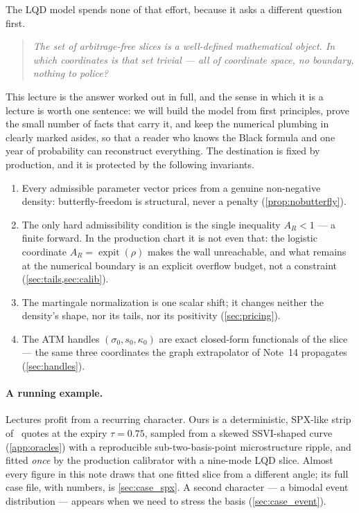 \documentclass[11pt]{article}
\begin{document}
The LQD model spends none of that effort, because it asks a different
question first.

\begin{quote}
\emph{The set of arbitrage-free slices is a well-defined mathematical object.
In which coordinates is that set trivial --- all of coordinate space, no
boundary, nothing to police?}
\end{quote}

This lecture is the answer worked out in full, and the sense in which it is a
lecture is worth one sentence: we will build the model from first principles,
prove the small number of facts that carry it, and keep the numerical
plumbing in clearly marked asides, so that a reader who knows the Black
formula and one year of probability can reconstruct everything.  The
destination is fixed by production, and it is protected by the following
invariants.

\begin{invariant}
\begin{enumerate}[leftmargin=1.6em]
\item Every admissible parameter vector prices from a genuine non-negative
density: butterfly-freedom is structural, never a penalty
(\cref{prop:nobutterfly}).
\item The only hard admissibility condition is the single inequality $A_R<1$
--- a finite forward.  In the production chart it is not even that: the
logistic coordinate $A_R=\operatorname{expit}(\rho)$ makes the wall
unreachable, and what remains at the numerical boundary is an explicit
overflow budget, not a constraint (\cref{sec:tails,sec:calib}).
\item The martingale normalization is one scalar shift; it changes neither
the density's shape, nor its tails, nor its positivity (\cref{sec:pricing}).
\item The ATM handles $(\sigma_0,s_0,\kappa_0)$ are exact closed-form
functionals of the slice --- the same three coordinates the graph
extrapolator of Note~14 propagates (\cref{sec:handles}).
\end{enumerate}
\end{invariant}

\paragraph{A running example.}  Lectures profit from a recurring character.
Ours is a deterministic, SPX-like strip of \lqdfreshspxnquotes\ quotes at the
expiry $\tau=0.75$, sampled from a skewed SSVI-shaped curve
(\cref{app:oracles}) with a reproducible sub-two-basis-point microstructure
ripple, and fitted \emph{once} by the production calibrator with a
nine-mode LQD slice.  Almost every figure in this note draws that one fitted
slice from a different angle; its full case file, with numbers, is
\cref{sec:case_spx}.  A second character --- a bimodal event distribution ---
appears when we need to stress the basis (\cref{sec:case_event}).
\end{document}

